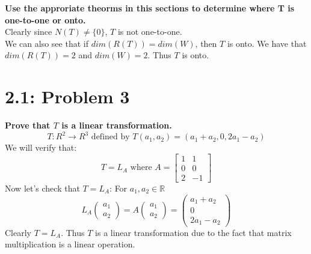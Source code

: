 \documentclass[answers,12pt,addpoints]{exam}
\begin{document}
\textbf{Use the approriate theorms in this sections to determine where T is one-to-one or onto.}\\
Clearly since $N(T) \neq \{0\}$, $T$ is not one-to-one. \\
We can also see that if $dim(R(T)) = dim(W)$, then $T$ is onto. We have that $dim(R(T)) = 2$ and $dim(W) = 2$. Thus $T$ is onto.\\

\section*{2.1: Problem 3}
\textbf{Prove that $T$ is a linear transformation.}\\
$$ T: R^2 \to R^3 \text{ defined by } T(a_1,a_2) = (a_1 +a_2, 0, 2a_1-a_2)$$
We will verify that:
$$ T = L_A \text{ where } A = \begin{bmatrix} 1 & 1 \\ 0 & 0 \\ 2 & -1 \end{bmatrix} $$
Now let's check that $T = L_A$: For $a_1, a_2 \in \mathds{R}$
$$ L_A \begin{pmatrix}
a_1 \\ a_2
\end{pmatrix} = A \begin{pmatrix}
a_1 \\ a_2
\end{pmatrix} = \begin{pmatrix}
a_1 + a_2 \\ 0 \\ 2a_1 - a_2
\end{pmatrix}$$
Clearly $T = L_A$. Thus $T$ is a linear transformation due to the fact that matrix multiplication is a linear operation.\\
\end{document}

